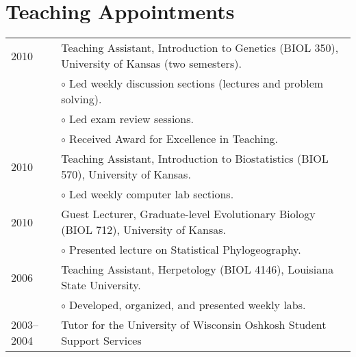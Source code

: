 \documentclass[10pt]{article}
\renewcommand{\labelitemi}{$\circ$}
\newcommand{\tableSubItem}{\addtolength{\leftskip}{1em} \labelitemi \xspace}
\begin{document}
\section*{Teaching Appointments}
\noindent\begin{tabulary}{\textwidth}{ @{} l L @{} }
2010		& Teaching Assistant, Introduction to Genetics (BIOL 350),
              University of Kansas (two semesters). \\
        & \tableSubItem Led weekly discussion sections (lectures and problem
              solving). \\
        & \tableSubItem Led exam review sessions. \\
        & \tableSubItem Received Award for Excellence in Teaching. \\[0.25em]
2010		& Teaching Assistant, Introduction to Biostatistics (BIOL 570),
              University of Kansas. \\
        & \tableSubItem Led weekly computer lab sections. \\[0.25em]
2010		& Guest Lecturer, Graduate-level Evolutionary Biology (BIOL 712),
              University of Kansas. \\
        & \tableSubItem Presented lecture on Statistical Phylogeography.
              \\[0.25em]
2006		& Teaching Assistant, Herpetology (BIOL 4146), Louisiana State
              University. \\
        & \tableSubItem Developed, organized, and presented weekly labs.
              \\[0.25em]
2003--2004	& Tutor for the University of Wisconsin Oshkosh Student Support
              Services \\
\end{tabulary}
\end{document}
